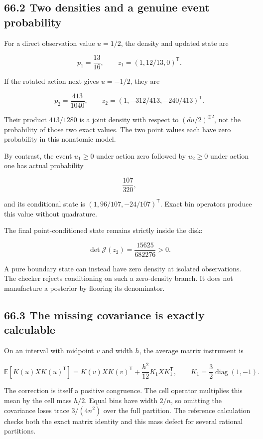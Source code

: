 \documentclass[11pt,letterpaper]{article}
\begin{document}
\subsection{66.2 Two densities and a genuine event
probability}\label{two-densities-and-a-genuine-event-probability}

For a direct observation value \(u=1/2\), the density and updated state
are

\[
p_1=\frac{13}{16},\qquad z_1=(1,12/13,0)^{\mathsf T}.
\]

If the rotated action next gives \(u=-1/2\), they are

\[
p_2=\frac{413}{1040},\qquad
z_2=(1,-312/413,-240/413)^{\mathsf T}.
\]

Their product \(413/1280\) is a joint density with respect to
\((du/2)^{\otimes2}\), not the probability of those two exact values.
The two point values each have zero probability in this nonatomic model.

By contrast, the event \(u_1\geq0\) under action zero followed by
\(u_2\geq0\) under action one has actual probability

\[
\boxed{\frac{107}{320},}
\]

and its conditional state is \((1,96/107,-24/107)^{\mathsf T}\). Exact
bin operators produce this value without quadrature.

The final point-conditioned state remains strictly inside the disk:

\[
\det\mathcal J(z_2)=\frac{15625}{682276}>0.
\]

A pure boundary state can instead have zero density at isolated
observations. The checker rejects conditioning on such a zero-density
branch. It does not manufacture a posterior by flooring its denominator.

\subsection{66.3 The missing covariance is exactly
calculable}\label{the-missing-covariance-is-exactly-calculable}

On an interval with midpoint \(v\) and width \(h\), the average matrix
instrument is

\[
\mathbb E[K(u)XK(u)^{\mathsf T}]
=K(v)XK(v)^{\mathsf T}
+\frac{h^2}{12}K_1XK_1^{\mathsf T},
\qquad K_1=\frac32\operatorname{diag}(1,-1).
\]

The correction is itself a positive congruence. The cell operator
multiplies this mean by the cell mass \(h/2\). Equal bins have width
\(2/n\), so omitting the covariance loses trace \(3/(4n^2)\) over the
full partition. The reference calculation checks both the exact matrix
identity and this mass defect for several rational partitions.
\end{document}
